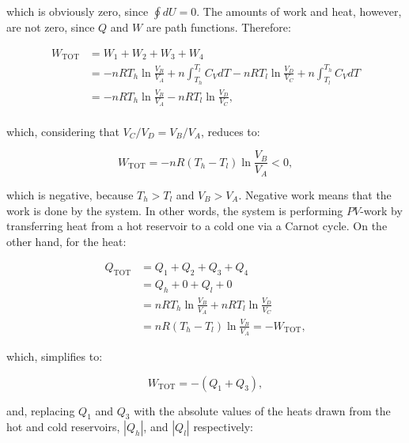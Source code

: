 \documentclass[
  9pt,
]{extbook}
\theoremstyle{definition}
\theoremstyle{definition}
\theoremstyle{definition}
\theoremstyle{definition}
\theoremstyle{remark}
\begin{document}
which is obviously zero, since \(\oint dU=0\). The amounts of work and heat, however, are not zero, since \(Q\) and \(W\) are path functions. Therefore:

\begin{equation}
\begin{aligned}
  W_{\text{TOT}} & = W_1+W_2+W_3+W_4 \\
                 & = - nRT_h \ln \frac{V_B}{V_A} + n \int_{T_h}^{T_l} C_V dT - nRT_l \ln \frac{V_D}{V_C} + n \int_{T_l}^{T_h} C_V dT \\
                 & = - nRT_h \ln \frac{V_B}{V_A} - nRT_l \ln \frac{V_D}{V_C}, \\
\end{aligned}
  \label{eq:WtotCC}
\end{equation}

which, considering that \(V_C/V_D=V_B/V_A\), reduces to:

\begin{equation}
  W_{\text{TOT}} = - nR \left( T_h-T_l \right) \ln \frac{V_B}{V_A} < 0,
  \label{eq:WtotCC2}
\end{equation}

which is negative, because \(T_h>T_l\) and \(V_B>V_A\). Negative work means that the work is done by the system. In other words, the system is performing \(PV\)-work by transferring heat from a hot reservoir to a cold one via a Carnot cycle. On the other hand, for the heat:

\begin{equation}
\begin{aligned}
  Q_{\text{TOT}} & = Q_1+Q_2+Q_3+Q_4 \\
                 & = Q_h + 0 + Q_l + 0    \\
                 & = nRT_h \ln \frac{V_B}{V_A} + nRT_l \ln \frac{V_D}{V_C} \\
                 & = nR \left( T_h-T_l \right) \ln \frac{V_B}{V_A} = -W_{\text{TOT}},
\end{aligned}
  \label{eq:QtotCC}
\end{equation}

which, simplifies to:

\begin{equation}
W_{\text{TOT}}=-(Q_1+Q_3),
  \label{eq:WtotCC3}
\end{equation}

and, replacing \(Q_1\) and \(Q_3\) with the absolute values of the heats drawn from the hot and cold reservoirs, \(\left| Q_h \right|\), and \(\left| Q_l \right|\) respectively:
\end{document}
